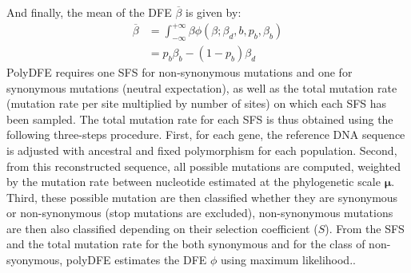 \documentclass{article}
\newcommand{\UniDimArray}[1]{\bm{#1}}
\newcommand{\Spop}{\beta}
\newcommand{\SpopMean}{\overline{\Spop}}
\newcommand{\Sphy}{S}
\begin{document}
    And finally, the mean of the DFE $\overline{\Spop}$ is given by:
    \begin{align*}
        \SpopMean & = \int_{-\infty}^{+\infty} \Spop \phi \left( \Spop; \Spop_d , b, p_b, \Spop_b \right) \\
                         & =  p_b \Spop_b - \left( 1 - p_b \right) \Spop_d
    \end{align*}
    PolyDFE requires one SFS for non-synonymous mutations and one for synonymous mutations (neutral expectation), as well as the total mutation rate (mutation rate per site multiplied by number of sites) on which each SFS has been sampled.
    The total mutation rate for each SFS is thus obtained using the following three-steps procedure.
    First, for each gene, the reference DNA sequence is adjusted with ancestral and fixed polymorphism for each population.
    Second, from this reconstructed sequence, all possible mutations are computed, weighted by the mutation rate between nucleotide estimated at the phylogenetic scale $\UniDimArray{\mu}$.
    Third, these possible mutation are then classified whether they are synonymous or non-synonymous (stop mutations are excluded), non-synonymous mutations are then also classified depending on their selection coefficient ($\Sphy$).
    From the SFS and the total mutation rate for the both synonymous and for the class of non-syonymous, polyDFE estimates the DFE $\phi$ using maximum likelihood.\@.

    \printbibliography
\end{document}
